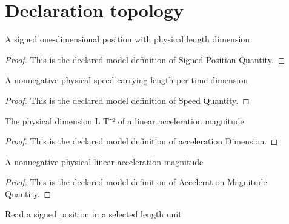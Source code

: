 \section{Declaration topology}
\begin{definition}
  \label{def:physics:phyx-mini-0794:phyxminiproblems-problemphyxmini0794-signedpositionquantity}
  A signed one-dimensional position with physical length dimension
\end{definition}
\begin{proof}
  This is the declared model definition of Signed Position Quantity.
\end{proof}
\begin{definition}
  \label{def:physics:phyx-mini-0794:phyxminiproblems-problemphyxmini0794-speedquantity}
  A nonnegative physical speed carrying length-per-time dimension
\end{definition}
\begin{proof}
  This is the declared model definition of Speed Quantity.
\end{proof}
\begin{definition}
  \label{def:physics:phyx-mini-0794:phyxminiproblems-problemphyxmini0794-accelerationdimension}
  The physical dimension L T⁻² of a linear acceleration magnitude
\end{definition}
\begin{proof}
  This is the declared model definition of acceleration Dimension.
\end{proof}
\begin{definition}
  \label{def:physics:phyx-mini-0794:phyxminiproblems-problemphyxmini0794-accelerationmagnitudequantity}
  A nonnegative physical linear-acceleration magnitude
\end{definition}
\begin{proof}
  This is the declared model definition of Acceleration Magnitude Quantity.
\end{proof}
\begin{definition}
  \label{def:physics:phyx-mini-0794:phyxminiproblems-problemphyxmini0794-signedpositionreadout}
  Read a signed position in a selected length unit
\end{definition}
